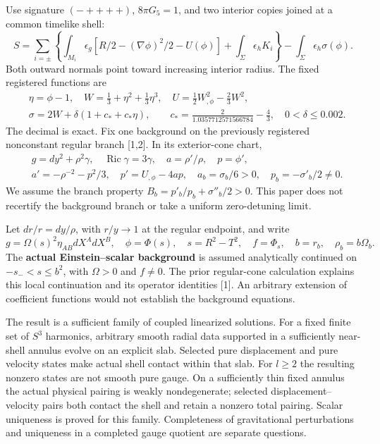 \documentclass[
  10pt,
]{article}
\begin{document}
Use signature \((-++++)\), \(8\pi G_5=1\), and two interior copies
joined at a common timelike shell: \[
 S=\sum_{i=\pm}\left\{\int_{M_i}\epsilon_g
 [R/2-(\nabla\phi)^2/2-U(\phi)]+\int_\Sigma\epsilon_h K_i\right\}
 -\int_\Sigma\epsilon_h\sigma(\phi).                       \tag{1}
\] Both outward normals point toward increasing interior radius. The
fixed registered functions are \[
 \begin{aligned}
 &\eta=\phi-1,\quad W=\tfrac13+\eta^2+\tfrac13\eta^3,\quad
 U=\tfrac12W_{,\phi}^2-\tfrac23W^2,\\
 &
 \sigma=2W+\delta(1+c_*+c_*\eta),
 \qquad c_*=\frac2{1.0357712571566784}-\frac43,\quad
 0<\delta\le0.002.
 \end{aligned}                                         \tag{2}
\] The decimal is exact. Fix one background on the previously registered
nonconstant regular branch {[}1,2{]}. In its exterior-cone chart, \[
 \begin{aligned}
 &g=dy^2+\rho^2\gamma,\quad \operatorname{Ric}\gamma=3\gamma,
 \quad a=\rho'/\rho,\quad p=\phi',\\
 &
 a'=-\rho^{-2}-p^2/3,\quad p'=U_{,\phi}-4ap,
 \quad a_b=\sigma_b/6>0,\quad p_b=-\sigma'_b/2\ne0.
 \end{aligned}           \tag{3}
\] We assume the branch property \(B_b=p'_b/p_b+\sigma''_b/2>0\). This
paper does not recertify the background branch or take a uniform
zero-detuning limit.

Let \(dr/r=dy/\rho\), with \(r/y\to1\) at the regular endpoint, and
write \[
 g=\Omega(s)^2\eta_{AB}dX^AdX^B,\quad
 \phi=\Phi(s),\quad s=R^2-T^2,\quad f=\Phi_s,
 \quad b=r_b,\quad\rho_b=b\Omega_b.                         \tag{4}
\] The \textbf{actual Einstein--scalar background} is assumed
analytically continued on \(-s_-<s\le b^2\), with \(\Omega>0\) and
\(f\ne0\). The prior regular-cone calculation explains this local
continuation and its operator identities {[}1{]}. An arbitrary extension
of coefficient functions would not establish the background equations.

The result is a sufficient family of coupled linearized solutions. For a
fixed finite set of \(S^3\) harmonics, arbitrary smooth radial data
supported in a sufficiently near-shell annulus evolve on an explicit
slab. Selected pure displacement and pure velocity states make actual
shell contact within that slab. For \(l\ge2\) the resulting nonzero
states are not smooth pure gauge. On a sufficiently thin fixed annulus
the actual physical pairing is weakly nondegenerate; selected
displacement--velocity pairs both contact the shell and retain a nonzero
total pairing. Scalar uniqueness is proved for this family. Completeness
of gravitational perturbations and uniqueness in a completed gauge
quotient are separate questions.
\end{document}
